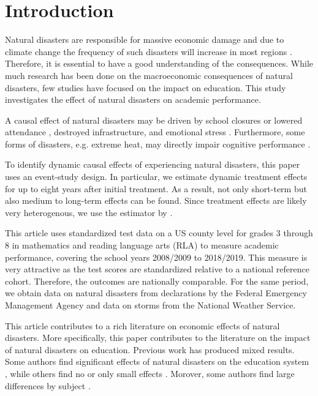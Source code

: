 
\section{Introduction}

Natural disasters are responsible for massive economic damage and due to climate change the frequency of such disasters will increase in most regions \citep{IPCC_2021}. Therefore, it is essential to have a good understanding of the consequences. While much research has been done on the macroeconomic consequences of natural disasters, few studies have focused on the impact on education. This study investigates the effect of natural disasters on academic performance.

A causal effect of natural disasters may be driven by school closures \citep{Grewening_2020} or lowered attendance \citep{Spencer_2016}, destroyed infrastructure, and emotional stress \citep{Vogel_2016}. Furthermore, some forms of disasters, e.g. extreme heat, may directly impair cognitive performance \citep{Ramsey_1995}.

To identify dynamic causal effects of experiencing natural disasters, this paper uses an event-study design. In particular, we estimate dynamic treatment effects for up to eight years after initial treatment. As a result, not only short-term but also medium to long-term effects can be found. Since treatment effects are likely very heterogenous, we use the estimator by \cite{Sun_2021}. 

This article uses standardized test data on a US county level for grades 3 through 8 in mathematics and reading language arts (RLA) to measure academic performance, covering the school years 2008/2009 to 2018/2019. This measure is very attractive as the test scores are standardized relative to a national reference cohort. Therefore, the outcomes are nationally comparable. For the same period, we obtain data on natural disasters from declarations by the Federal Emergency Management Agency and data on storms from the National Weather Service.

This article contributes to a rich literature on economic effects of natural disasters. More specifically, this paper contributes to the literature on the impact of natural disasters on education. Previous work has produced mixed results. Some authors find significant effects of natural disasters on the education system \citep{Holmes_2002, Cuaresma_2010, Sacerdote_2012, Goodman_2020}, while others find no or only small effects \citep{Baggerly_2008, Pane_2008}. Morover, some authors find large differences by subject \citep{Spencer_2016}.

